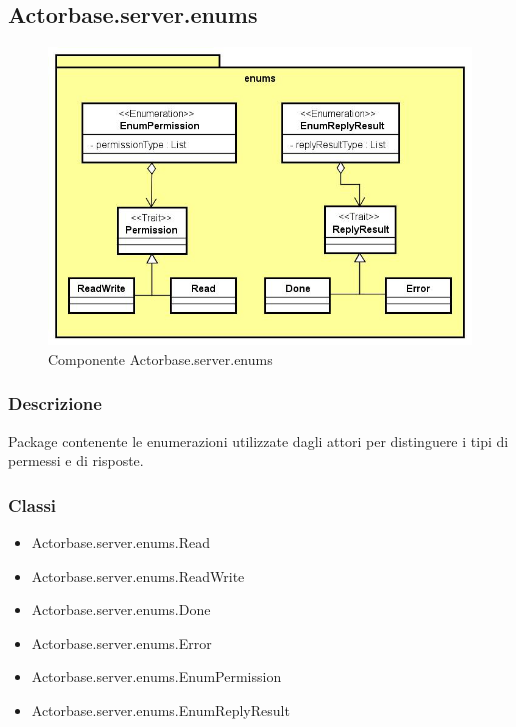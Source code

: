 \documentclass[a4paper]{article}
\begin{document}
		\subsection{Actorbase.server.enums}
		
			\begin{figure} [H]
				\centering
				\includegraphics[width=\textwidth]{ST/Server/enumsLevel.jpg}
				\caption{Componente Actorbase.server.enums}
			\end{figure}
			
			\subsubsection{Descrizione}
				Package contenente le enumerazioni utilizzate dagli attori per distinguere i tipi di permessi e di risposte.
				
			\subsubsection{Classi}
				\begin{itemize}
					\item Actorbase.server.enums.Read
					\item Actorbase.server.enums.ReadWrite
					\item Actorbase.server.enums.Done
					\item Actorbase.server.enums.Error
					\item Actorbase.server.enums.EnumPermission
					\item Actorbase.server.enums.EnumReplyResult
				\end{itemize}
				
\end{document}
